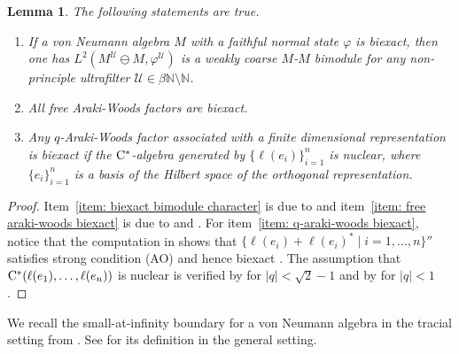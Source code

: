 \documentclass[a4paper,11pt]{amsart}
\newtheorem{lem}[thm]{Lemma}
\theoremstyle{definition}
\newcommand{\N}{{\mathbb N}}
\newcommand{\cU}{{\mathcal U}}
\begin{document}
\begin{lem}\label{lem: biexact prelim}
The following statements are true.	
\begin{enumerate}
\item If a von Neumann algebra $M$ with a faithful normal state $\varphi$ is biexact, 
	then one has $L^2(M^\cU\ominus M, \varphi^\cU)$ is a weakly coarse $M$-$M$ bimodule for any non-principle ultrafilter $\cU\in \beta\N\setminus\N$. \label{item: biexact bimodule character}
\item All free Araki-Woods factors are biexact. \label{item: free araki-woods biexact}
\item Any $q$-Araki-Woods factor associated with a finite dimensional representation is biexact if the ${\rm C}^*$-algebra generated by $\{\ell(e_i)\}_{i=1}^n$ is nuclear, where $\{e_i\}_{i=1}^n$ is a basis of the Hilbert space of the orthogonal representation.
	\label{item: q-araki-woods biexact}
\end{enumerate}
\end{lem}
\begin{proof}
Item~\ref{item: biexact bimodule character} is due to \cite[Theorem 7.19, 7.20]{DP23}
	and item~\ref{item: free araki-woods biexact} is due to \cite[Theorem C.2]{HoIs17} and \cite[Theorem 7.17]{DP23}.
For item~\ref{item: q-araki-woods biexact}, notice that the computation in \cite[Lemma 3.1]{Shl04}
	shows that $\{\ell (e_i)+\ell (e_i)^*\mid i=1,\dots, n\}''$ satisfies strong condition (AO) \cite[Definition 2.6]{HoIs17}
	and hence biexact \cite[Theorem 7.17]{DP23}.
The assumption that ${\rm C}^*(\ell(e_1), \dots, \ell(e_n))$ is nuclear is verified by \cite{JSW94} for $|q|<\sqrt 2-1$
	and by \cite{Ku22} for $|q|<1$.
\end{proof}

We recall the small-at-infinity boundary for a von Neumann algebra in the tracial setting from \cite{DKEP22}.
See \cite{DP23} for its definition in the general setting.
\end{document}
